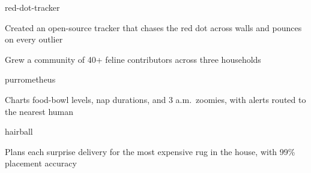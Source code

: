 \documentclass{resume}
\begin{document}
\begin{projects}
  \begin{project}{red-dot-tracker}
    \item Created an open-source tracker that chases the red dot across walls and pounces on every outlier
    \item Grew a community of 40+ feline contributors across three households
  \end{project}
  \begin{project}{purrometheus}
    \item Charts food-bowl levels, nap durations, and 3 a.m.\ zoomies, with alerts routed to the nearest human
  \end{project}
  \begin{project}{hairball}
    \item Plans each surprise delivery for the most expensive rug in the house, with 99\% placement accuracy
  \end{project}
\end{projects}

\education[dissertation]



\end{document}
